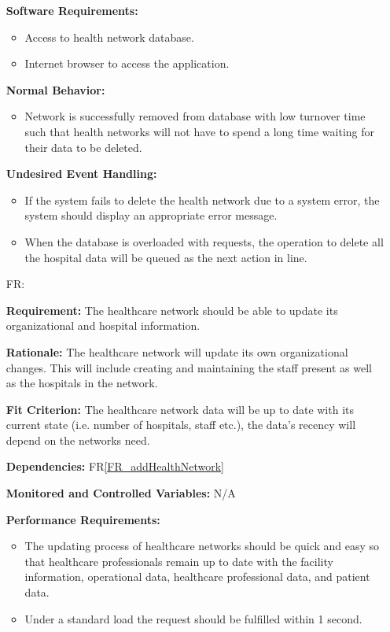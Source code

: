 \documentclass[12pt]{article}
\newcounter{reqnum} %
\begin{document}
\begin{itemize}
  \textbf{Software Requirements:}
  \begin{itemize}
    \item Access to health network database.
    \item Internet browser to access the application.
  \end{itemize}
  
  \textbf{Normal Behavior:}
  \begin{itemize}
    \item Network is successfully removed from database with low turnover time such that health networks will not have to spend a long time waiting for their data to be deleted.
  \end{itemize}
  
  \textbf{Undesired Event Handling:}
  \begin{itemize}
    \item If the system fails to delete the health network due to a system error, the system should display an appropriate error message. 
    \item When the database is overloaded with requests, the operation to delete all the hospital data will be queued as the next action in line.
  \end{itemize}
  
  
  \item[FR\refstepcounter{reqnum}\thereqnum \label{FR_UpdateHealthNetwork}:]
  
  \textbf{Requirement:} The healthcare network should be able to update its organizational and hospital information.
  
  \textbf{Rationale:} The healthcare network will update its own organizational changes. This will include creating and maintaining the staff present as well as the hospitals in the network.
  
  \textbf{Fit Criterion:} The healthcare network data will be up to date with its current state (i.e. number of hospitals, staff etc.), the data's recency will depend on the networks need. 
  
  \textbf{Dependencies:} FR\ref{FR_addHealthNetwork}
  
  \textbf{Monitored and Controlled Variables:} N/A
  
  \textbf{Performance Requirements:} 
  \begin{itemize}
    \item The updating process of healthcare networks should be quick and easy so that healthcare professionals remain up to date with the facility information, operational data, healthcare professional data, and patient data.
    \item Under a standard load the request should be fulfilled within 1 second.
  \end{itemize}
  

\end{itemize}
\end{document}

